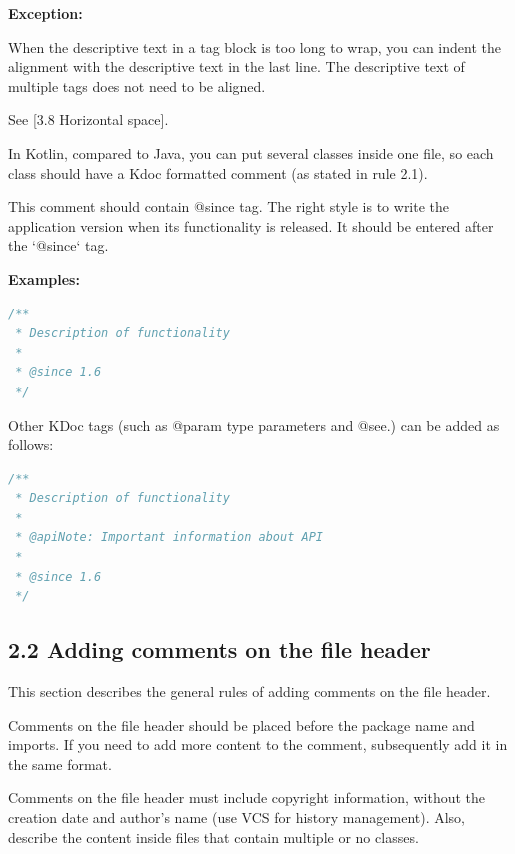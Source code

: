  

\textbf{Exception:}

 

When the descriptive text in a tag block is too long to wrap, you can indent the alignment with the descriptive text in the last line. The descriptive text of multiple tags does not need to be aligned.

See [3.8 Horizontal space].



In Kotlin, compared to Java, you can put several classes inside one file, so each class should have a Kdoc formatted comment (as stated in rule 2.1).

This comment should contain @since tag. The right style is to write the application version when its functionality is released. It should be entered after the `@since` tag.



\textbf{Examples:}



\begin{lstlisting}[language=Kotlin]
/**
 * Description of functionality
 *
 * @since 1.6
 */
\end{lstlisting}


Other KDoc tags (such as @param type parameters and @see.) can be added as follows:

\begin{lstlisting}[language=Kotlin]
/**
 * Description of functionality
 *
 * @apiNote: Important information about API
 *
 * @since 1.6
 */
\end{lstlisting}


\subsection*{\textbf{2.2 Adding comments on the file header}}

\label{sec:2.2}



This section describes the general rules of adding comments on the file header.

Comments on the file header should be placed before the package name and imports. If you need to add more content to the comment, subsequently add it in the same format.



Comments on the file header must include copyright information, without the creation date and author's name (use VCS for history management). Also, describe the content inside files that contain multiple or no classes.



